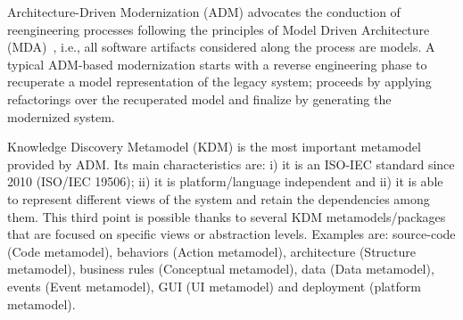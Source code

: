 





Architecture-Driven Modernization (ADM) advocates the conduction of reengineering processes following the principles of Model Driven Architecture (MDA)~\cite{1686216, Heckel2008, 7051941, IRIDurelliCatalogo}, i.e., all software artifacts considered along the process are models. A typical ADM-based modernization starts with a reverse engineering phase to recuperate a model representation of the legacy system; proceeds by applying refactorings over the recuperated model and finalize by generating the modernized system.

Knowledge Discovery Metamodel (KDM) is the most important metamodel provided by ADM. Its main characteristics are: i) it is an ISO-IEC standard since 2010 (ISO/IEC 19506); ii) it is platform/language independent and ii) it is able to represent different views of the system and retain the dependencies among them. This third point is possible thanks to several KDM metamodels/packages that are focused on specific views or abstraction levels. Examples are:  source-code (Code metamodel), behaviors (Action metamodel), architecture (Structure metamodel), business rules (Conceptual metamodel), data (Data metamodel), events (Event metamodel), GUI (UI metamodel) and deployment (platform metamodel).  

